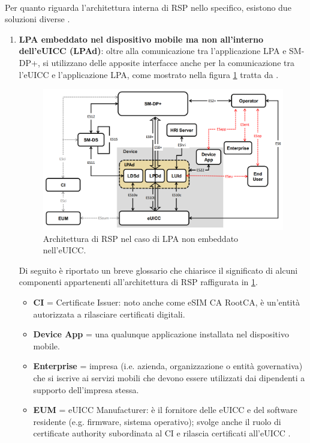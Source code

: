 \documentclass[10pt, twoside, openany]{book}
\begin{document}
\\Per quanto riguarda l'architettura interna di RSP nello specifico, esistono due soluzioni diverse \cite{GSMA-docs-new}.
\begin{enumerate}
\item \textbf{LPA embeddato nel dispositivo mobile ma non all'interno dell'eUICC (LPAd)}: oltre alla comunicazione tra l'applicazione LPA e SM-DP+, si utilizzano delle apposite interfacce anche per la comunicazione tra l'eUICC e l'applicazione LPA, come mostrato nella figura \ref{fig:RSP-LPAd} tratta da \cite{GSMA-docs-new}.
\begin{figure}
\includegraphics[width=\linewidth]{RSP-LPAd.png}
\caption{Architettura di RSP nel caso di LPA non embeddato nell'eUICC.}
\label{fig:RSP-LPAd}
\end{figure}
Di seguito è riportato un breve glossario che chiarisce il significato di alcuni componenti appartenenti all'architettura di RSP raffigurata in \ref{fig:RSP-LPAd}.
\begin{itemize}
\item \textbf{CI} = Certificate Issuer: noto anche come eSIM CA RootCA, è un'entità autorizzata a rilasciare certificati digitali.
\item \textbf{Device App} = una qualunque applicazione installata nel dispositivo mobile.
\item \textbf{Enterprise} = impresa (i.e. azienda, organizzazione o entità governativa) che si iscrive ai servizi mobili che devono essere utilizzati dai dipendenti a supporto dell'impresa stessa.
\item \textbf{EUM} = eUICC Manufacturer: è il fornitore delle eUICC e del software residente (e.g. firmware, sistema operativo); svolge anche il ruolo di certificate authority subordinata al CI e rilascia certificati all'eUICC \cite{Sec-analysis}.

\end{itemize}
\end{enumerate}
\end{document}
